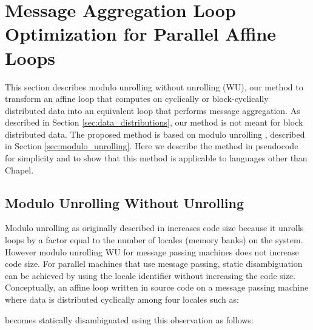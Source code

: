 \section{Message Aggregation Loop Optimization for Parallel Affine Loops}\label{sec:transformation} 

This section describes modulo unrolling without unrolling (WU), our method to transform an affine loop that computes on cyclically or block-cyclically distributed data into an equivalent loop that performs message aggregation. As described in Section \ref{sec:data_distributions}, our method is not meant for block distributed data. The proposed method is based on modulo unrolling \cite{barua1999maps}, described in Section \ref{sec:modulo_unrolling}. Here we describe the method in pseudocode for simplicity and to show that this method is applicable to languages other than Chapel. 

\subsection{Modulo Unrolling Without Unrolling}\label{subsec:modulo_unrolling_without_unrolling}

Modulo unrolling as originally described in \cite{barua1999maps} increases code size because it unrolls loops by a factor equal to the number of locales (memory banks) on the system. However modulo unrolling WU for message passing machines does not increase code size. For parallel machines that use message passing, static disambiguation can be achieved by using the locale identifier without increasing the code size. Conceptually, an affine loop written in source code on a message passing machine where data is distributed cyclically among four locales such as:\newline



\tab{\texttt{\}}}\newline

becomes statically disambiguated using this observation as follows:\newline



\tab{\texttt{\}}}\newline

